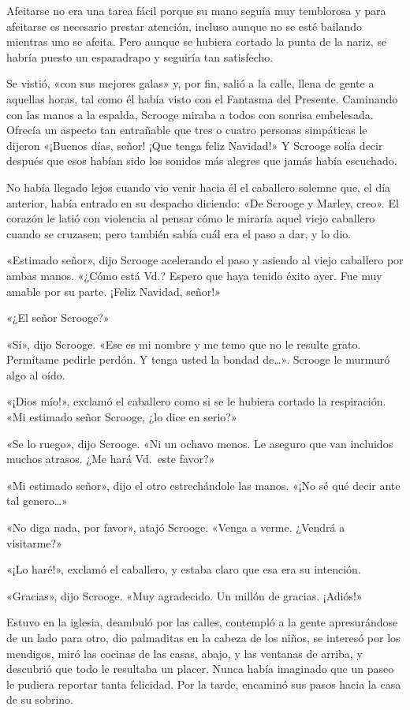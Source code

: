 \documentclass{novela}
\begin{document}
 Afeitarse no era una tarea fácil porque su mano seguía muy temblorosa y para afeitarse es necesario prestar atención, incluso aunque no se esté bailando mientras uno se afeita. Pero aunque se hubiera cortado la punta de la nariz, se habría puesto un esparadrapo y seguiría tan satisfecho.

 Se vistió, «con sus mejores galas» y, por fin, salió a la calle, llena de gente a aquellas horas, tal como él había visto con el Fantasma del Presente. Caminando con las manos a la espalda, Scrooge miraba a todos con sonrisa embelesada. Ofrecía un aspecto tan entrañable que tres o cuatro personas simpáticas le dijeron «¡Buenos días, señor! ¡Que tenga feliz Navidad!» Y Scrooge solía decir después que esos habían sido los sonidos más alegres que jamás había escuchado.

 No había llegado lejos cuando vio venir hacia él el caballero solemne que, el día anterior, había entrado en su despacho diciendo: «De Scrooge y Marley, creo». El corazón le latió con violencia al pensar cómo le miraría aquel viejo caballero cuando se cruzasen; pero también sabía cuál era el paso a dar, y lo dio.



 «Estimado señor», dijo Scrooge acelerando el paso y asiendo al viejo caballero por ambas manos. «¿Cómo está Vd.? Espero que haya tenido éxito ayer. Fue muy amable por su parte. ¡Feliz Navidad, señor!»

 «¿El señor Scrooge?»

 «Sí», dijo Scrooge. «Ese es mi nombre y me temo que no le resulte grato. Permítame pedirle perdón. Y tenga usted la bondad de{\ldots}». Scrooge le murmuró algo al oído.

 «¡Dios mío!», exclamó el caballero como si se le hubiera cortado la respiración. «Mi estimado señor Scrooge, ¿lo dice en serio?»

 «Se lo ruego», dijo Scrooge. «Ni un ochavo menos. Le aseguro que van incluidos muchos atrasos. ¿Me hará Vd.\  este favor?»

 «Mi estimado señor», dijo el otro estrechándole las manos. «¡No sé qué decir ante tal genero{\ldots}»

 «No diga nada, por favor», atajó Scrooge. «Venga a verme. ¿Vendrá a visitarme?»

 «¡Lo haré!», exclamó el caballero, y estaba claro que esa era su intención.

 «Gracias», dijo Scrooge. «Muy agradecido. Un millón de gracias. ¡Adiós!»

 Estuvo en la iglesia, deambuló por las calles, contempló a la gente apresurándose de un lado para otro, dio palmaditas en la cabeza de los niños, se interesó por los mendigos, miró las cocinas de las casas, abajo, y las ventanas de arriba, y descubrió que todo le resultaba un placer. Nunca había imaginado que un paseo le pudiera reportar tanta felicidad. Por la tarde, encaminó sus pasos hacia la casa de su sobrino.
\end{document}
